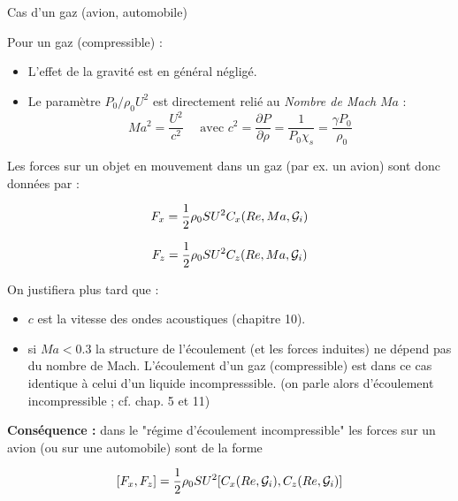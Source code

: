 \begin{frame}{Cas d'un gaz (avion, automobile)}

\small
Pour un gaz (compressible) :
\smallskip
\pause 
\begin{itemize}


\item L'effet de la gravité est en général négligé.

\pause

\item 
Le paramètre $P_0/\rho_0 U^2$ est directement relié au {\em Nombre de Mach} $Ma$ : 
$$
Ma^2 = \frac{U^2}{c^2} \quad \mbox{ avec } c^2 = \frac{\partial P}{\partial \rho} = \frac{1}{P_0 \chi_s} = \frac{\gamma P_0}{\rho_0}
$$


\end{itemize}

\smallskip
\pause 
Les forces sur un objet en mouvement dans un gaz (par ex. un avion) sont donc données par :

$$
F_x = \frac{1}{2} \rho_0 S U^2 C_x(Re,Ma, {\cal G}_i) 
$$

$$
F_z = \frac{1}{2} \rho_0 S U^2 C_z(Re,Ma, {\cal G}_i) 
$$

\pause
\medskip

On justifiera plus tard que :
\smallskip

\begin{itemize}
\item $c$ est la vitesse des ondes acoustiques (chapitre 10).

\item si $Ma < 0.3$ la structure de l'écoulement (et les forces induites) ne dépend pas du nombre de Mach. 
L'écoulement d'un gaz (compressible) est dans ce cas identique à celui d'un liquide incompresssible.
(on parle alors d'écoulement incompressible ; cf. chap. 5 et 11)
 
 \end{itemize}
 
 
 
 \pause 
 \medskip
 
{\bf Conséquence :} dans le "régime d'écoulement incompressible" les forces sur un avion (ou sur une automobile) sont de la forme 

$$
[F_x,F_z] = \frac{1}{2} \rho_0 S U^2 [C_x(Re,{\cal G}_i) ,C_z(Re,{\cal G}_i) ] 
$$


\end{frame}





